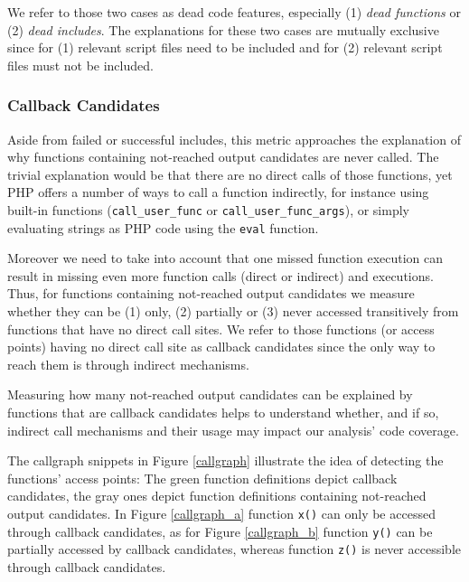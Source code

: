 \documentclass{sig-alternate-05-2015}
\begin{document}
We refer to those two cases as dead code features, especially (1) \emph{dead functions} or (2) \emph{dead includes}. The explanations for these two cases are mutually exclusive since for (1) relevant script files need to be included and for (2) relevant script files must not be included.

\subsubsection{Callback Candidates} \label{callback_candidate_section}
Aside from failed or successful includes, this metric approaches the explanation of why functions containing not-reached output candidates are never called. The trivial explanation would be that there are no direct calls of those functions, yet PHP offers a number of ways to call a function indirectly, for instance using built-in functions (\texttt{call\_user\_func} or \texttt{call\_user\_func\_args}), or simply evaluating strings as PHP code using the \texttt{eval} function. 

Moreover we need to take into account that one missed function execution can result in missing even more function calls (direct or indirect) and executions. Thus, for functions containing not-reached output candidates we measure whether they can be (1) only, (2) partially or (3) never accessed transitively from functions that have no direct call sites. We refer to those functions (or access points) having no direct call site as callback candidates since the only way to reach them is through indirect mechanisms.

Measuring how many not-reached output candidates can be explained by functions that are callback candidates helps to understand whether, and if so, indirect call mechanisms and their usage may impact our analysis' code coverage.

The callgraph snippets in Figure \ref{callgraph} illustrate the idea of detecting the functions' access points: The green function definitions depict callback candidates, the gray ones depict function definitions containing not-reached output candidates. In Figure \ref{callgraph_a} function \texttt{x()} can only be accessed through callback candidates, as for Figure \ref{callgraph_b} function \texttt{y()} can be partially accessed by callback candidates, whereas function \texttt{z()} is never accessible through callback candidates.
\end{document}
